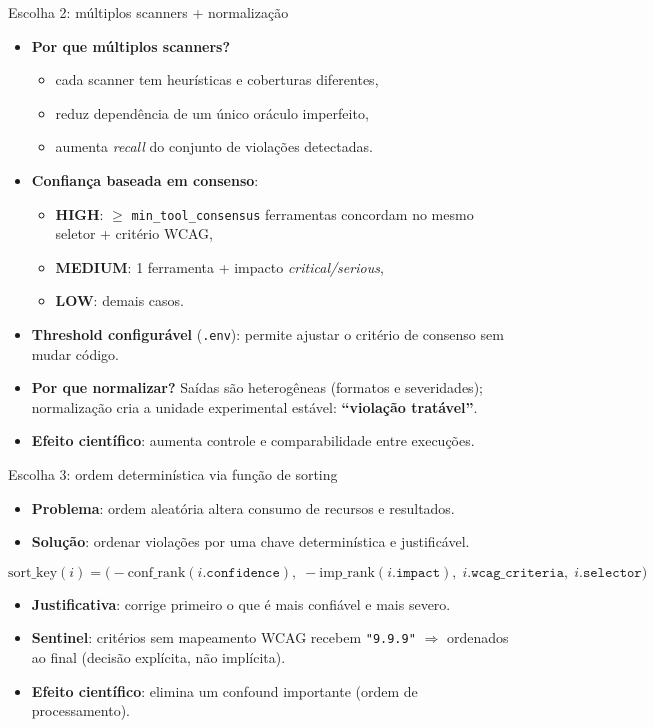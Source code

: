 \documentclass[aspectratio=169]{beamer}
\begin{document}
\begin{frame}{Escolha 2: múltiplos scanners + normalização}
\small
\begin{itemize}
  \item \textbf{Por que múltiplos scanners?}
  \begin{itemize}
    \item cada scanner tem heurísticas e coberturas diferentes,
    \item reduz dependência de um único oráculo imperfeito,
    \item aumenta \emph{recall} do conjunto de violações detectadas.
  \end{itemize}
  \item \textbf{Confiança baseada em consenso}:
  \begin{itemize}
    \item \textbf{HIGH}: $\geq$ \texttt{min\_tool\_consensus} ferramentas concordam
          no mesmo seletor + critério WCAG,
    \item \textbf{MEDIUM}: 1 ferramenta + impacto \emph{critical/serious},
    \item \textbf{LOW}: demais casos.
  \end{itemize}
  \item \textbf{Threshold configurável} (\texttt{.env}): permite ajustar o
        critério de consenso sem mudar código.
  \item \textbf{Por que normalizar?} Saídas são heterogêneas (formatos e
        severidades); normalização cria a unidade experimental estável:
        \textbf{``violação tratável''}.
  \item \textbf{Efeito científico}: aumenta controle e comparabilidade entre execuções.
\end{itemize}
\end{frame}

\begin{frame}{Escolha 3: ordem determinística via função de sorting}
\small
\begin{itemize}
  \item \textbf{Problema}: ordem aleatória altera consumo de recursos e resultados.
  \item \textbf{Solução}: ordenar violações por uma chave determinística e justificável.
\end{itemize}
\vspace{0.4em}
\[
  \text{sort\_key}(i)=\bigl(
  -\text{conf\_rank}(i.\texttt{confidence}),\;
  -\text{imp\_rank}(i.\texttt{impact}),\;
  i.\texttt{wcag\_criteria},\;
  i.\texttt{selector}
  \bigr)
\]
\vspace{0.2em}
\begin{itemize}
  \item \textbf{Justificativa}: corrige primeiro o que é mais confiável
        e mais severo.
  \item \textbf{Sentinel}: critérios sem mapeamento WCAG recebem
        \texttt{"9.9.9"} $\Rightarrow$ ordenados ao final
        (decisão explícita, não implícita).
  \item \textbf{Efeito científico}: elimina um confound importante
        (ordem de processamento).
\end{itemize}
\end{frame}
\end{document}
